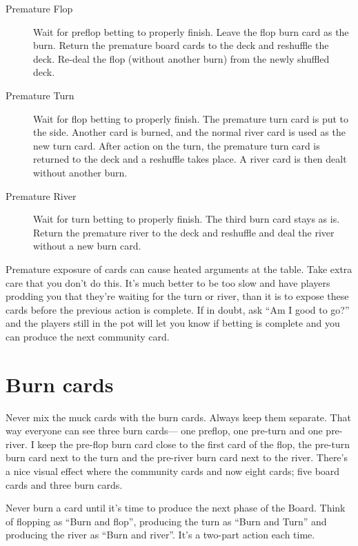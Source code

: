 \begin{description}

\item[Premature Flop] Wait for preflop betting to properly finish.
Leave the flop burn card as the burn. Return the premature board
cards to the deck and reshuffle the deck. Re-deal the flop
(without another burn) from the newly shuffled deck.

\item[Premature Turn]  Wait for flop betting to properly finish.
The premature turn card is put to the side.
Another card is burned, and the normal river card is used as the new turn card.
After action on the turn, the premature turn card is returned to the deck
and a reshuffle takes place. A river card is then dealt without another
burn.

\item[Premature River] Wait for turn betting to properly finish.
The third burn card stays as is. Return the premature river to the
deck and reshuffle and deal the river without a new burn card.

\end{description}

Premature exposure of cards can cause heated arguments at the table.
Take extra care that you don't do this. It's much better to be too slow
and have players prodding you that they're waiting for the turn or
river, than it is to expose these cards before the previous action
is complete. If in doubt, ask ``Am I good to go?'' and the players still
in the pot will let you know if betting is complete and you can
produce the next community card.

\section{Burn cards}

Never mix the muck cards with the burn cards. Always keep them
separate. That way everyone can see three burn cards--- one preflop,
one pre-turn and one pre-river. I keep the pre-flop burn card close to
the first card of the flop, the pre-turn burn card next to the turn and
the pre-river burn card next to the river. There's a nice visual effect
where the community cards and now eight cards; five board cards and three
burn cards.

Never burn a card until it's time to produce the next phase
of the Board. Think of flopping as ``Burn and flop'', producing the
turn as ``Burn and Turn'' and producing the river as ``Burn and river''.
It's a two-part action each time.

